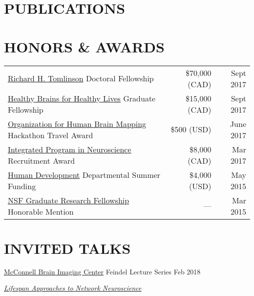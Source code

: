\documentclass{dupre-cv}
\begin{document}
\section{PUBLICATIONS}


\section{HONORS \& AWARDS}
\vspace{-5pt}

\noindent\begin{tabularx}{\textwidth}{@{}lrr@{}}

\href{https://www.mcgill.ca/gps/funding/achievements/tomlinsonscholars}{Richard H. Tomlinson} Doctoral Fellowship & \$70,000 (CAD) & Sept 2017 \\

\href{https://www.mcgill.ca/hbhl/about-hbhl}{Healthy Brains for Healthy Lives} Graduate Fellowship & \$15,000 (CAD) & Sept 2017 \\

\href{https://ohbm.github.io/hackathon2017/}{Organization for Human Brain Mapping} Hackathon Travel Award & \$500 (USD) & June 2017 \\

\href{http://www.mcgill.ca/ipn/}{Integrated Program in Neuroscience} Recruitment Award & \$8,000 (CAD) & Mar 2017 \\

\href{http://www.human.cornell.edu/hd/}{Human Development} Departmental Summer Funding & \$4,000 (USD) & May 2015 \\

\href{https://www.nsfgrfp.org/}{NSF Graduate Research Fellowship} Honorable Mention & --- & Mar 2015
\end{tabularx}

\vspace{15pt}

\section{INVITED TALKS}

\href{https://www.mcgill.ca/bic/home}{McConnell Brain Imaging Center} Feindel Lecture Series \hfill Feb 2018 \\[0.15cm]
\begin{minipage}{10cm}
\textit{\href{http://emdupre.me/feindel-slides}{Lifespan Approaches to Network Neuroscience}}
\end{minipage} \\
\vspace{5pt}
\end{document}
